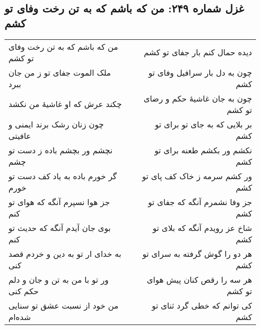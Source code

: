 \begin{center}
\section*{غزل شماره ۲۴۹: من که باشم که به تن رخت وفای تو کشم}
\label{sec:249}
\begin{longtable}{l p{0.5cm} r}
من که باشم که به تن رخت وفای تو کشم
&&
دیده حمال کنم بار جفای تو کشم
\\
ملک الموت جفای تو ز من جان ببرد
&&
چون به دل بار سرافیل وفای تو کشم
\\
چکند عرش که او غاشیهٔ من نکشد
&&
چون به جان غاشیهٔ حکم و رضای تو کشم
\\
چون زنان رشک برند ایمنی و عافیتی
&&
بر بلایی که به جای تو برای تو کشم
\\
نچشم ور بچشم باده ز دست تو چشم
&&
نکشم ور بکشم طعنه برای تو کشم
\\
گر خورم باده به یاد کف دست تو خورم
&&
ور کشم سرمه ز خاک کف پای تو کشم
\\
جز هوا نسپرم آنگه که هوای تو کنم
&&
جز وفا نشمرم آنگه که جفای تو کشم
\\
بوی جان آیدم آنگه که حدیث تو کنم
&&
شاخ عز رویدم آنگه که بلای تو کشم
\\
به خدای ار تو به دین و خردم قصد کنی
&&
هر دو را گوش گرفته به سرای تو کشم
\\
ور تو با من به تن و جان و دلم حکم کنی
&&
هر سه را رقص کنان پیش هوای تو کشم
\\
من خود از نسبت عشق تو سنایی شده‌ام
&&
کی توانم که خطی گرد ثنای تو کشم
\\
\end{longtable}
\end{center}
